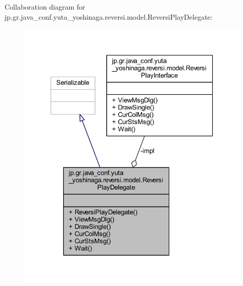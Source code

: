 Collaboration diagram for jp.\+gr.\+java\+\_\+conf.\+yuta\+\_\+yoshinaga.\+reversi.\+model.\+Reversi\+Play\+Delegate\+:\nopagebreak
\begin{figure}[H]
\begin{center}
\leavevmode
\includegraphics[width=326pt]{classjp_1_1gr_1_1java__conf_1_1yuta__yoshinaga_1_1reversi_1_1model_1_1_reversi_play_delegate__coll__graph}
\end{center}
\end{figure}
